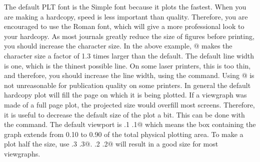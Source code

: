 The default PLT font is the Simple font because it plots the fastest.
When you are making a hardcopy, speed is less important than quality.
Therefore, you are encouraged to use the Roman font,
which will give a more professional look to your hardcopy.
As most journals greatly reduce the size of figures before printing,
you should increase the character size.
In the above example, @ makes the character size a
factor of 1.3 times larger than the default.
The default line width is one, which is the thinest possible line.
On some laser printers, this is too thin, and therefore, you should
increase the line width, using the \verb@LWidth@ command.
Using @ is not unreasonable for publication quality
on some printers.
In general the default hardcopy plot will fill the page on
which it is being plotted.
If a viewgraph was made of a full page plot,
the projected size would overfill most screens.
Therefore, it is useful to decrease the default size of the plot a
bit.
This can be done with the \verb@Viewport@ command.
The default viewport is \verb@.1 .1@ which means the box
containing the graph extends from 0.10 to 0.90 of the total
physical plotting area.
To make a plot half the size, use \verb@View .3 .3@.
\verb@View .2 .2@ will result in a good size for most viewgraphs.
